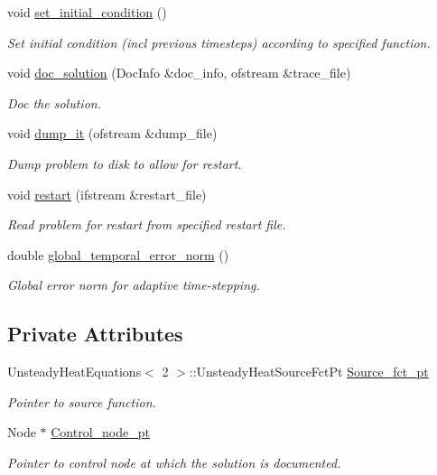 \begin{DoxyCompactItemize}
void \hyperlink{classUnsteadyHeatProblem_a98de3ed2d9cf5409323121bbb482bc1b}{set\+\_\+initial\+\_\+condition} ()
\begin{DoxyCompactList}\small\item\em Set initial condition (incl previous timesteps) according to specified function. \end{DoxyCompactList}\item 
void \hyperlink{classUnsteadyHeatProblem_a2c0c4b762d2dbde7396dca2a6750f433}{doc\+\_\+solution} (Doc\+Info \&doc\+\_\+info, ofstream \&trace\+\_\+file)
\begin{DoxyCompactList}\small\item\em Doc the solution. \end{DoxyCompactList}\item 
void \hyperlink{classUnsteadyHeatProblem_a9a60874a6471414819301705f1a2afd1}{dump\+\_\+it} (ofstream \&dump\+\_\+file)
\begin{DoxyCompactList}\small\item\em Dump problem to disk to allow for restart. \end{DoxyCompactList}\item 
void \hyperlink{classUnsteadyHeatProblem_ad0a4a1c1da24f6d62f64b0d40be31709}{restart} (ifstream \&restart\+\_\+file)
\begin{DoxyCompactList}\small\item\em Read problem for restart from specified restart file. \end{DoxyCompactList}\item 
double \hyperlink{classUnsteadyHeatProblem_a888e25dd97e89d31e485cb188721dbe1}{global\+\_\+temporal\+\_\+error\+\_\+norm} ()
\begin{DoxyCompactList}\small\item\em Global error norm for adaptive time-\/stepping. \end{DoxyCompactList}\end{DoxyCompactItemize}
\subsection*{Private Attributes}
\begin{DoxyCompactItemize}
\item 
Unsteady\+Heat\+Equations$<$ 2 $>$\+::Unsteady\+Heat\+Source\+Fct\+Pt \hyperlink{classUnsteadyHeatProblem_a09c5c208069fcf5f36d54f994bd54e93}{Source\+\_\+fct\+\_\+pt}
\begin{DoxyCompactList}\small\item\em Pointer to source function. \end{DoxyCompactList}\item 
Node $\ast$ \hyperlink{classUnsteadyHeatProblem_a33f2d1de7d1fa651df34bc0e4e747c67}{Control\+\_\+node\+\_\+pt}
\begin{DoxyCompactList}\small\item\em Pointer to control node at which the solution is documented. \end{DoxyCompactList}\end{DoxyCompactItemize}


